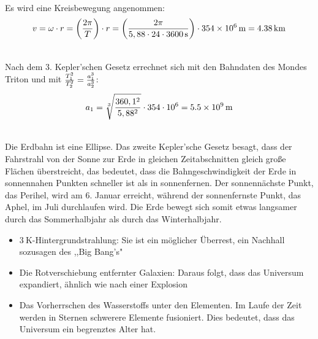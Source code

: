 \documentclass[a4paper]{article}
\begin{document}
\vspace{0.5 cm}


\\
Es wird eine Kreisbewegung angenommen:
$$ v = \omega \cdot r = \left( {2 \pi \over T } \right) \cdot r = \left( {2 \pi \over 5,88 \cdot 24 \cdot \SI{3600}{\second}} \right) \cdot \SI{354e6}{\meter}  = \SI{4,38}{\kilo\meter}$$
\vspace{0.5 cm}

\\
Nach dem 3. Kepler'schen Gesetz errechnet sich mit den Bahndaten des Mondes Triton und mit ${T_1^2 \over T_2^2} ={a_1^3 \over a_2^3}$:
$$ a_1 = \sqrt[3]{360,1^2 \over 5,88^2} \cdot 354 \cdot 10^6 =\SI{5,5e9}{\meter} $$ 
\vspace{0.5 cm}

\\
Die Erdbahn ist eine Ellipse. Das zweite Kepler'sche Gesetz besagt, dass der Fahrstrahl von der Sonne zur Erde in gleichen Zeitabschnitten gleich große Flächen überstreicht, das bedeutet, dass die Bahngeschwindigkeit der Erde in sonnennahen Punkten schneller ist als in sonnenfernen. Der sonnennächste Punkt, das Perihel, wird am 6. Januar erreicht, während der sonnenfernste Punkt, das Aphel, im Juli durchlaufen wird. Die Erde bewegt sich somit etwas langsamer durch das Sommerhalbjahr als durch das Winterhalbjahr.
 \vspace{0.5 cm}
 
\begin{itemize}
    \item $\SI{3}{\kelvin}$-Hintergrundstrahlung: Sie ist ein möglicher Überrest, ein Nachhall sozusagen     des ,,Big Bang's"
    \item  Die Rotverschiebung entfernter Galaxien: Daraus folgt, dass das Universum expandiert, ähnlich wie nach einer Explosion
    \item Das Vorherrschen des Wasserstoffs unter den Elementen. Im Laufe der Zeit werden in Sternen schwerere Elemente fusioniert. Dies bedeutet, dass das Universum ein begrenztes Alter hat.
\end{itemize}
\vspace{0.5 cm}
\end{document}
